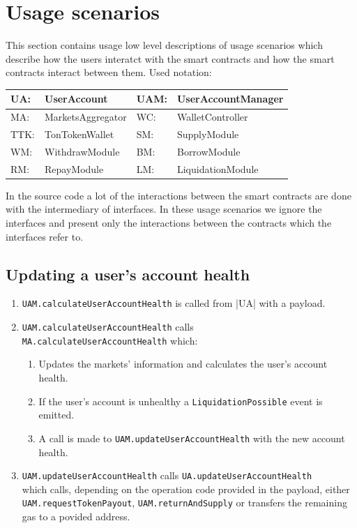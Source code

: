 \section{Usage scenarios}

This section contains usage low level descriptions of usage scenarios which describe how the users interatct with the smart contracts and how the smart contracts interact between them. 
\newpage
Used notation:

\begin{tabularx}{\textwidth}{|l X|l X|} \hline 
  UA: & UserAccount &         UAM: & UserAccountManager \\\hline 
  MA: & MarketsAggregator &   WC: & WalletController \\\hline
  TTK: & TonTokenWallet &     SM: & SupplyModule \\\hline
  WM: & WithdrawModule &      BM: & BorrowModule \\\hline
  RM: & RepayModule &         LM: & LiquidationModule \\\hline
\end{tabularx}

In the source code a lot of the interactions between the smart contracts are done with the intermediary of interfaces. In these usage scenarios we ignore the interfaces and present only the interactions between the contracts which the interfaces refer to. 

\subsection{Updating a user's account health}
\begin{enumerate}
  \item \verb|UAM.calculateUserAccountHealth| is called from |UA| with a payload.
  \item \verb|UAM.calculateUserAccountHealth| calls \\\verb|MA.calculateUserAccountHealth| which:
  \begin{enumerate}[label*=\arabic*.]
    \item Updates the markets' information and calculates the user's account health.
    \item If the user's account is unhealthy a \verb|LiquidationPossible| event is emitted.
    \item A call is made to \verb|UAM.updateUserAccountHealth| with the new account health.
  \end{enumerate}
  \item \verb|UAM.updateUserAccountHealth| calls \verb|UA.updateUserAccountHealth| \\which calls, depending on the operation code provided in the payload, either \verb|UAM.requestTokenPayout|, \verb|UAM.returnAndSupply| or transfers the remaining gas to a povided address.
\end{enumerate}


